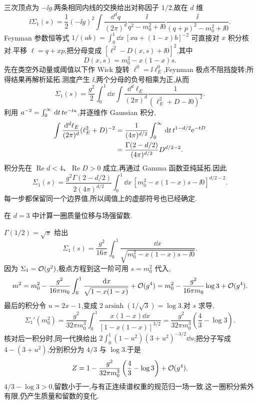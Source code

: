 三次顶点为 $-\ii g$.两条相同内线的交换给出对称因子 $1/2$,故在 $d$ 维
\begin{equation}\label{eq:bubble-start}
 \ii\Sigma_1(s)=\frac12(-\ii g)^2\int\frac{\dd^dq}{(2\pi)^d}
 \frac{\ii}{q^2-m_0^2+\ii0}\frac{\ii}{(q+p)^2-m_0^2+\ii0}.
\end{equation}
Feynman 参数恒等式 $1/(ab)=\int_0^1\dd x\,[xa+(1-x)b]^{-2}$ 可直接对 $x$ 积分核对.平移 $\ell=q+xp$,把分母变成 $[\ell^2-D(x,s)+\ii0]^2$,其中
\[
 D(x,s)=m_0^2-x(1-x)s.
\]
先在类空外动量或阈值以下作 Wick 旋转 $\ell^0=\ii\ell_E^0$,Feynman 极点不阻挡旋转;所得结果再解析延拓.测度产生 $\ii$,两个分母的负号相乘为正,从而
\[
 \Sigma_1(s)=\frac{g^2}{2}\int_0^1\dd x
 \int\frac{\dd^d\ell_E}{(2\pi)^d}\frac1{(\ell_E^2+D-\ii0)^2}.
\]
利用 $a^{-2}=\int_0^\infty\,\mathrm d t\,t\mathrm e^{-ta}$,并逐维作 Gaussian 积分,
\begin{align*}
 \int\frac{\,\mathrm d^d\ell_E}{(2\pi)^d}(\ell_E^2+D)^{-2}
 &=\frac1{(4\pi)^{d/2}}\int_0^\infty\,\mathrm d t\,t^{1-d/2}\mathrm e^{-tD}\\
 &=\frac{\Gamma(2-d/2)}{(4\pi)^{d/2}}D^{d/2-2}.
\end{align*}
积分先在 $\operatorname{Re}d<4$、$\operatorname{Re}D>0$ 成立,再通过 Gamma 函数亚纯延拓.因此
\begin{equation}\label{eq:bubble-d-general}
 \Sigma_1(s)=\frac{g^2\Gamma(2-d/2)}{2(4\pi)^{d/2}}
 \int_0^1\dd x\,[m_0^2-x(1-x)s-\ii0]^{d/2-2}.
\end{equation}
每一步都保留同一个边界值,所以阈值上的虚部符号也已经确定.

\begin{example}
在 $d=3$ 中计算一圈质量位移与场强留数.
\end{example}
\begin{solution}
$\Gamma(1/2)=\sqrt\pi$ 给出
\[
 \Sigma_1(s)=\frac{g^2}{16\pi}\int_0^1\frac{\dd x}{\sqrt{m_0^2-x(1-x)s-\ii0}}.
\]
因为 $\Sigma_1=\mathcal O(g^2)$,极点方程到这一阶可用 $s=m_0^2$ 代入,
\[
 m^2=m_0^2-\frac{g^2}{16\pi m_0}
 \int_0^1\frac{\,\mathrm d x}{\sqrt{1-x(1-x)}}+\mathcal O(g^4)
 =m_0^2-\frac{g^2}{16\pi m_0}\log3+\mathcal O(g^4).
\]
最后的积分令 $u=2x-1$,变成 $2\operatorname{arsinh}(1/\sqrt3)=\log3$.对 $s$ 求导,
\[
 \Sigma_1'(m_0^2)=\frac{g^2}{32\pi m_0^3}
 \int_0^1\frac{x(1-x)\dd x}{[1-x(1-x)]^{3/2}}
 =\frac{g^2}{32\pi m_0^3}\left(\frac43-\log3\right).
\]
核对后一积分时,同一代换给出
$2\int_0^1(1-u^2)(3+u^2)^{-3/2}\dd u$;把分子写成 $4-(3+u^2)$,分别积分为 $4/3$ 与 $\log3$.于是
\[
 Z=1-\frac{g^2}{32\pi m_0^3}\left(\frac43-\log3\right)+\mathcal O(g^4).
\]
$4/3-\log3>0$,留数小于一,与有正连续谱权重的规范归一场一致.这一圈积分紫外有限,仍产生质量和留数的变化.
\end{solution}

